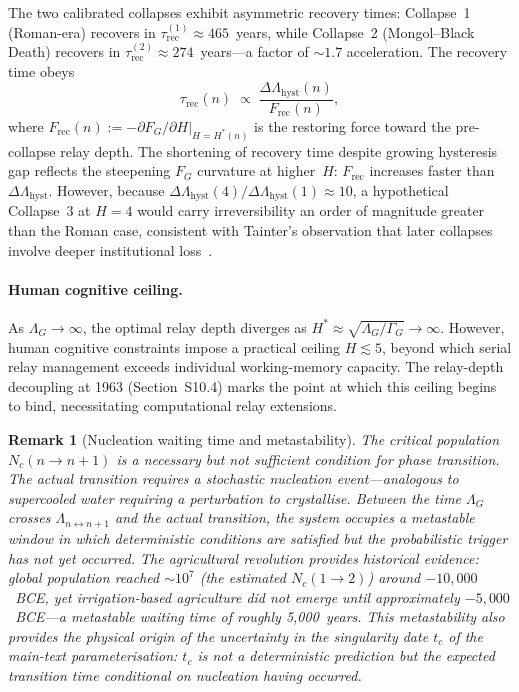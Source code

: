 \documentclass[11pt]{article}
\newtheorem{remark}{Remark}
\begin{document}
The two calibrated collapses exhibit asymmetric recovery times:
Collapse~1 (Roman-era) recovers in $\tau_{\mathrm{rec}}^{(1)}\approx 465$~years,
while Collapse~2 (Mongol--Black Death) recovers in $\tau_{\mathrm{rec}}^{(2)}\approx 274$~years---a
factor of $\sim\!1.7$ acceleration. The recovery time obeys
\[
  \tau_{\mathrm{rec}}(n) \;\propto\; \frac{\Delta\Lambda_{\mathrm{hyst}}(n)}{F_{\mathrm{rec}}(n)},
\]
where $F_{\mathrm{rec}}(n) := -\partial F_G/\partial H\big|_{H=H^*(n)}$ is the
restoring force toward the pre-collapse relay depth. The shortening of recovery
time despite growing hysteresis gap reflects the steepening $F_G$ curvature
at higher~$H$: $F_{\mathrm{rec}}$ increases faster than $\Delta\Lambda_{\mathrm{hyst}}$.
However, because $\Delta\Lambda_{\mathrm{hyst}}(4)/\Delta\Lambda_{\mathrm{hyst}}(1)\approx 10$,
a hypothetical Collapse~3 at $H=4$ would carry irreversibility an order of magnitude
greater than the Roman case, consistent with Tainter's observation that later
collapses involve deeper institutional loss~\cite{tainter1988}.

\paragraph{Human cognitive ceiling.}
As $\Lambda_G\to\infty$, the optimal relay depth diverges as
$H^*\approx\sqrt{\Lambda_G/\Gamma_G}\to\infty$. However, human cognitive
constraints impose a practical ceiling $H\lesssim 5$, beyond which
serial relay management exceeds individual working-memory capacity.
The relay-depth decoupling at 1963 (Section~S10.4) marks the point at
which this ceiling begins to bind, necessitating computational relay
extensions.

\begin{remark}[Nucleation waiting time and metastability]
\label{rmk:nucleation}
The critical population $N_c(n\!\to\!n{+}1)$ is a necessary but not
sufficient condition for phase transition. The actual transition
requires a stochastic nucleation event---analogous to supercooled water
requiring a perturbation to crystallise. Between the time $\Lambda_G$
crosses $\Lambda_{n\leftrightarrow n+1}$ and the actual transition, the
system occupies a \emph{metastable window} in which deterministic
conditions are satisfied but the probabilistic trigger has not yet
occurred. The agricultural revolution provides historical evidence: global
population reached $\sim\!10^7$ (the estimated $N_c(1\!\to\!2)$)
around $-10{,}000$~BCE, %
yet irrigation-based agriculture did not emerge
until approximately $-5{,}000$~BCE---a metastable waiting time of
roughly 5,000~years. This metastability also provides the physical
origin of the uncertainty in the singularity date $t_c$ of the main-text
parameterisation: $t_c$ is not a deterministic prediction but the
expected transition time conditional on nucleation having occurred.
\end{remark}
\end{document}
